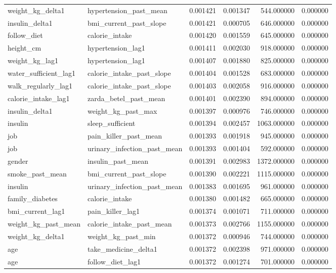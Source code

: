 \begin{longtable}{llrrrr}
weight\_kg\_delta1 & hypertension\_past\_mean & 0.001421 & 0.001347 & 544.000000 & 0.000000 \\
insulin\_delta1 & bmi\_current\_past\_slope & 0.001421 & 0.000705 & 646.000000 & 0.000000 \\
follow\_diet & calorie\_intake & 0.001420 & 0.001559 & 645.000000 & 0.000000 \\
height\_cm & hypertension\_lag1 & 0.001411 & 0.002030 & 918.000000 & 0.000000 \\
weight\_kg\_lag1 & hypertension\_lag1 & 0.001407 & 0.001880 & 825.000000 & 0.000000 \\
water\_sufficient\_lag1 & calorie\_intake\_past\_slope & 0.001404 & 0.001528 & 683.000000 & 0.000000 \\
walk\_regularly\_lag1 & calorie\_intake\_past\_slope & 0.001403 & 0.002058 & 916.000000 & 0.000000 \\
calorie\_intake\_lag1 & zarda\_betel\_past\_mean & 0.001401 & 0.002390 & 894.000000 & 0.000000 \\
insulin\_delta1 & weight\_kg\_past\_max & 0.001397 & 0.000976 & 746.000000 & 0.000000 \\
insulin & sleep\_sufficient & 0.001394 & 0.002457 & 1063.000000 & 0.000000 \\
job & pain\_killer\_past\_mean & 0.001393 & 0.001918 & 945.000000 & 0.000000 \\
job & urinary\_infection\_past\_mean & 0.001393 & 0.001404 & 592.000000 & 0.000000 \\
gender & insulin\_past\_mean & 0.001391 & 0.002983 & 1372.000000 & 0.000000 \\
smoke\_past\_mean & bmi\_current\_past\_slope & 0.001390 & 0.002221 & 1115.000000 & 0.000000 \\
insulin & urinary\_infection\_past\_mean & 0.001383 & 0.001695 & 961.000000 & 0.000000 \\
family\_diabetes & calorie\_intake & 0.001380 & 0.001482 & 665.000000 & 0.000000 \\
bmi\_current\_lag1 & pain\_killer\_lag1 & 0.001374 & 0.001071 & 711.000000 & 0.000000 \\
weight\_kg\_past\_mean & calorie\_intake\_past\_mean & 0.001373 & 0.002766 & 1155.000000 & 0.000000 \\
weight\_kg\_delta1 & weight\_kg\_past\_min & 0.001372 & 0.000946 & 744.000000 & 0.000000 \\
age & take\_medicine\_delta1 & 0.001372 & 0.002398 & 971.000000 & 0.000000 \\
age & follow\_diet\_lag1 & 0.001372 & 0.001274 & 701.000000 & 0.000000 \\

\end{longtable}
